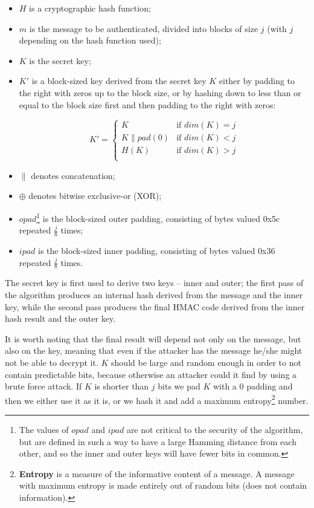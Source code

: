 \begin{itemize}
    \item $H$ is a cryptographic hash function;
    \item $m$ is the message to be authenticated, divided into blocks of size $j$ (with $j$ depending on the hash function used);
    \item $K$ is the secret key;
    \item $K'$ is a block-sized key derived from the secret key $K$ either by padding to the right with zeros up to the block size, or by hashing down to less than or equal to the block size first and then padding to the right with zeros:
    
    \begin{equation}
        K' = \begin{cases}
        K &\text{if $dim(K) = j$}\\
        K \parallel pad(0) &\text{if $dim(K) < j$}\\
        H(K) &\text{if $dim(K) > j$}\\
        \end{cases}
    \end{equation}
    
    \item $\parallel$ denotes concatenation;
    \item $\oplus$ denotes bitwise exclusive-or (XOR);
    \item $opad$\footnote{\label{foot:pad}The values of $opad$ and $ipad$ are not critical to the security of the algorithm, but are defined in such a way to have a large Hamming distance from each other, and so the inner and outer keys will have fewer bits in common.} is the block-sized outer padding, consisting of bytes valued 0x5c repeated $\frac{j}{8}$ times;
    \item $ipad$ is the block-sized inner padding, consisting of bytes valued 0x36 repeated $\frac{j}{8}$ times.
\end{itemize}

The secret key is first used to derive two keys – inner and outer; the first pass of the algorithm produces an internal hash derived from the message and the inner key, while the second pass produces the final HMAC code derived from the inner hash result and the outer key. 

It is worth noting that the final result will depend not only on the message, but also on the key, meaning that even if the attacker has the message he/she might not be able to decrypt it. $K$ should be large and random enough in order to not contain predictable bits, because otherwise an attacker could it find by using a brute force attack. If $K$ is shorter than $j$  bits we pad $K$ with a $0$ padding and then we either use it as it is, or we hash it and add a maximum entropy\footnote{\textbf{Entropy} is a measure of the informative content of a message. A message with maximum entropy is made entirely out of random bits (does not contain information).} number.

